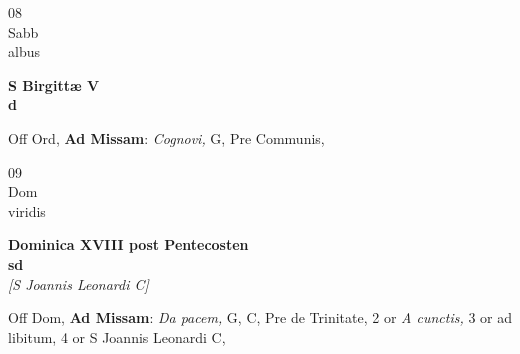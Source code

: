 \documentclass[10pt, openany]{book}
\begin{document}
        \begin{center}
            \begin{minipage}{3.5in}
                \vspace{2em}
                \begin{minipage}{0.5in}
                    {\Huge 08} \\
                    {\normalsize Sabb} \\
                    {\normalsize albus}
                \end{minipage}
                \begin{minipage}{3.0in}
                    \textbf{ \large S Birgittæ V \\
                    \textnormal{\normalsize d}} \\ 
                \end{minipage}
                \begin{justify}Off Ord, \textbf{Ad Missam}: \textit{Cognovi,} G, Pre Communis,  
                \end{justify}
            \end{minipage}
        \end{center}
    
        \begin{center}
            \begin{minipage}{3.5in}
                \vspace{2em}
                \begin{minipage}{0.5in}
                    {\Huge 09} \\
                    {\normalsize Dom} \\
                    {\normalsize viridis}
                \end{minipage}
                \begin{minipage}{3.0in}
                    \textbf{ \large Dominica XVIII post Pentecosten \\
                    \textnormal{\normalsize sd}} \\ \textit{[S Joannis Leonardi C]} \\ 
                \end{minipage}
                \begin{justify}Off Dom, \textbf{Ad Missam}: \textit{Da pacem,} G, C, Pre de Trinitate, 2 or \textit{A cunctis,} 3 or ad libitum, 4 or S Joannis Leonardi C,  
                \end{justify}
            \end{minipage}
        \end{center}
    
\end{document}
